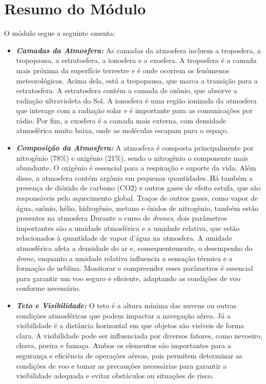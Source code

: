 \documentclass[a4paper, 12pt, onecolumn,singlespacing]{article}
\begin{document}
	\section{Resumo do Módulo}
	
	O módulo segue a seguinte ementa:
	
	\begin{itemize}
		
		\item \textbf{\textit{Camadas da Atmosfera: }} As camadas da atmosfera incluem a troposfera, a tropopausa, a estratosfera, a ionosfera e a exosfera. A troposfera é a camada mais próxima da superfície terrestre e é onde ocorrem os fenômenos meteorológicos. Acima dela, está a tropopausa, que marca a transição para a estratosfera. A estratosfera contém a camada de ozônio, que absorve a radiação ultravioleta do Sol. A ionosfera é uma região ionizada da atmosfera que interage com a radiação solar e é importante para as comunicações por rádio. Por fim, a exosfera é a camada mais externa, com densidade atmosférica muito baixa, onde as moléculas escapam para o espaço. 
		
		\item \textbf{\textit{Composição da Atmosfera: }} A atmosfera é composta principalmente por nitrogênio (78\%) e oxigênio (21\%), sendo o nitrogênio o componente mais abundante. O oxigênio é essencial para a respiração e suporte da vida. Além disso, a atmosfera contém argônio em pequenas quantidades. Há também a presença de dióxido de carbono (CO2) e outros gases de efeito estufa, que são responsáveis pelo aquecimento global. Traços de outros gases, como vapor de água, ozônio, hélio, hidrogênio, metano e óxidos de nitrogênio, também estão presentes na atmosfera
		Durante o curso de \textit{drones}, dois parâmetros importantes são a umidade atmosférica e a umidade relativa, que estão relacionados à quantidade de vapor d'água na atmosfera. A umidade atmosférica afeta a densidade do ar e, consequentemente, o desempenho do \textit{drone}, enquanto a umidade relativa influencia a sensação térmica e a formação de neblina. Monitorar e compreender esses parâmetros é essencial para garantir um voo seguro e eficiente, adaptando as condições de voo conforme necessário.
		
		\item \textbf{\textit{Teto e Visibilidade: }} O teto é a altura mínima das nuvens ou outras condições atmosféricas que podem impactar a navegação aérea. Já a visibilidade é a distância horizontal em que objetos são visíveis de forma clara. A visibilidade pode ser influenciada por diversos fatores, como nevoeiro, chuva, poeira e fumaça. Ambos os elementos são importantes para a segurança e eficiência de operações aéreas, pois permitem determinar as condições de voo e tomar as precauções necessárias para garantir a visibilidade adequada e evitar obstáculos ou situações de risco.
		

\end{itemize}
\end{document}
